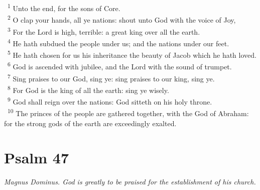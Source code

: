 \documentclass[a5paper,12pt]{article}
\begin{document}
\begin{multicols*}{2}
~\textsuperscript{1} Unto the end, for the sons of Core.\\
~\textsuperscript{2} O clap your hands, all ye nations: shout unto God with the voice of Joy,\\
~\textsuperscript{3} For the Lord is high, terrible: a great king over all the earth.\\
~\textsuperscript{4} He hath subdued the people under us; and the nations under our feet.\\
~\textsuperscript{5} He hath chosen for us his inheritance the beauty of Jacob which he hath loved.\\
~\textsuperscript{6} God is ascended with jubilee, and the Lord with the sound of trumpet.\\
~\textsuperscript{7} Sing praises to our God, sing ye: sing praises to our king, sing ye.\\
~\textsuperscript{8} For God is the king of all the earth: sing ye wisely.\\
~\textsuperscript{9} God shall reign over the nations: God sitteth on his holy throne.\\
~\textsuperscript{10} The princes of the people are gathered together, with the God of Abraham: for the strong gods of the earth are exceedingly exalted.\\

\section{Psalm 47}
\label{sec:orgef05962}
\emph{Magnus Dominus. God is greatly to be praised for the establishment of his church.}\\


\end{multicols*}
\end{document}
